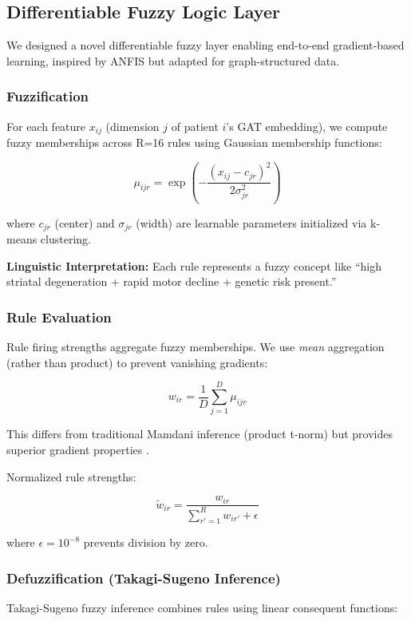 \documentclass[conference]{IEEEtran}
\begin{document}
\subsection{Differentiable Fuzzy Logic Layer}

We designed a novel differentiable fuzzy layer enabling end-to-end gradient-based learning, inspired by ANFIS \cite{jang1993anfis} but adapted for graph-structured data.

\subsubsection{Fuzzification}
For each feature $x_{ij}$ (dimension $j$ of patient $i$'s GAT embedding), we compute fuzzy memberships across R=16 rules using Gaussian membership functions:

\begin{equation}
\mu_{ijr} = \exp\left(-\frac{(x_{ij} - c_{jr})^2}{2\sigma_{jr}^2}\right)
\end{equation}

where $c_{jr}$ (center) and $\sigma_{jr}$ (width) are learnable parameters initialized via k-means clustering.

\textbf{Linguistic Interpretation:} Each rule represents a fuzzy concept like ``high striatal degeneration + rapid motor decline + genetic risk present.''

\subsubsection{Rule Evaluation}
Rule firing strengths aggregate fuzzy memberships. We use \textit{mean} aggregation (rather than product) to prevent vanishing gradients:

\begin{equation}
w_{ir} = \frac{1}{D}\sum_{j=1}^D \mu_{ijr}
\end{equation}

This differs from traditional Mamdani inference (product t-norm) but provides superior gradient properties \cite{wang2015differentiable}.

Normalized rule strengths:

\begin{equation}
\tilde{w}_{ir} = \frac{w_{ir}}{\sum_{r'=1}^R w_{ir'} + \epsilon}
\end{equation}

where $\epsilon=10^{-8}$ prevents division by zero.

\subsubsection{Defuzzification (Takagi-Sugeno Inference)}
Takagi-Sugeno fuzzy inference combines rules using linear consequent functions:
\end{document}
